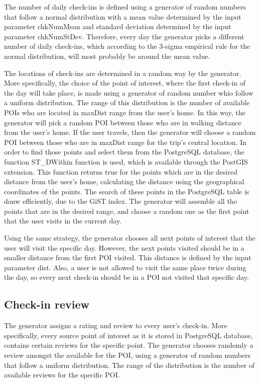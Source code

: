 The number of daily check-ins is defined using a generator of random numbers that follow a normal distribution with a mean value determined by the input parameter 
chkNumMean and standard deviation determined by the input parameter chkNumStDev. Therefore, every day the generator picks a different number of daily check-ins, which 
according to the 3-sigma empirical rule for the normal distribution, will most probably be around the mean value.

The locations of check-ins are determined in a random way by the generator. More specifically, the choice of the point of interest, where the first check-in of the day 
will take place, is made using a generator of random number whio follow a uniform distribution. The range of this distribution is the number of available POIs 
who are located in maxDist range from the user's home. In this way, the generator will pick a random POI between those who are in walking distance from the user's home. 
If the user travels, then the generator will choose a random POI between those who are in maxDist range for the trip's central location. In order to find those 
points and select them from the PostgreSQL database, the function ST\_DWithin function is used, which is available through the PostGIS extension. 
This function returns true for the points which are in the desired distance from the user's home, calculating the distance using the geographical coordinates of the points. 
The search of these points in the PostgreSQL table is donw efficiently, due to the GiST index.
The generator will assemble all the points that are in the desired range, and choose a random one as the first point that the user visits in the current day. 

Using the same strategy, the generator chooses all next points of interest that the user will visit the specific day. However, the next points visited should be in 
a smaller distance from the first POI visited. This distance is defined by the input parameter dist. Also, a user is not allowed to visit the same place twice 
during the day, so every next check-in should be in a POI not visited that specific day.

\subsection{Check-in review}

The generator assigns a rating and review to every user's check-in. More specifically, every source point of interest as it is stored in PostgreSQL database, 
contains certain reviews for the specific point. The generator chooses randomly a review amongst the available for the POI, using a generator of random 
numbers that follow a uniform distribution. The range of the distribution is the number of available reviews for the specific POI.

